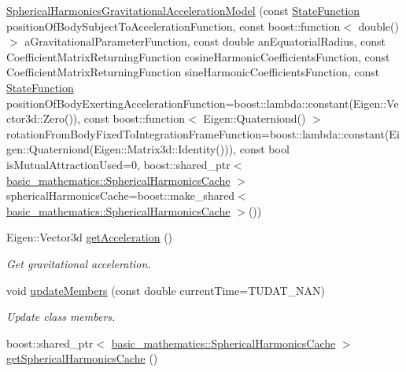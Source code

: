 \begin{DoxyCompactItemize}
\hyperlink{classtudat_1_1gravitation_1_1SphericalHarmonicsGravitationalAccelerationModel_ad222679658a992a85bf0c5dd7870b2a1}{Spherical\+Harmonics\+Gravitational\+Acceleration\+Model} (const \hyperlink{classtudat_1_1gravitation_1_1SphericalHarmonicsGravitationalAccelerationModelBase_a4ca706c4f941be481fc5f490e49390d8}{State\+Function} position\+Of\+Body\+Subject\+To\+Acceleration\+Function, const boost\+::function$<$ double() $>$ a\+Gravitational\+Parameter\+Function, const double an\+Equatorial\+Radius, const Coefficient\+Matrix\+Returning\+Function cosine\+Harmonic\+Coefficients\+Function, const Coefficient\+Matrix\+Returning\+Function sine\+Harmonic\+Coefficients\+Function, const \hyperlink{classtudat_1_1gravitation_1_1SphericalHarmonicsGravitationalAccelerationModelBase_a4ca706c4f941be481fc5f490e49390d8}{State\+Function} position\+Of\+Body\+Exerting\+Acceleration\+Function=boost\+::lambda\+::constant(Eigen\+::\+Vector3d\+::\+Zero()), const boost\+::function$<$ Eigen\+::\+Quaterniond() $>$ rotation\+From\+Body\+Fixed\+To\+Integration\+Frame\+Function=boost\+::lambda\+::constant(Eigen\+::\+Quaterniond(Eigen\+::\+Matrix3d\+::\+Identity())), const bool is\+Mutual\+Attraction\+Used=0, boost\+::shared\+\_\+ptr$<$ \hyperlink{classtudat_1_1basic__mathematics_1_1SphericalHarmonicsCache}{basic\+\_\+mathematics\+::\+Spherical\+Harmonics\+Cache} $>$ spherical\+Harmonics\+Cache=boost\+::make\+\_\+shared$<$ \hyperlink{classtudat_1_1basic__mathematics_1_1SphericalHarmonicsCache}{basic\+\_\+mathematics\+::\+Spherical\+Harmonics\+Cache} $>$())
\item 
Eigen\+::\+Vector3d \hyperlink{classtudat_1_1gravitation_1_1SphericalHarmonicsGravitationalAccelerationModel_aae27d6f97cdbee300e8c532b2dc604b3}{get\+Acceleration} ()
\begin{DoxyCompactList}\small\item\em Get gravitational acceleration. \end{DoxyCompactList}\item 
void \hyperlink{classtudat_1_1gravitation_1_1SphericalHarmonicsGravitationalAccelerationModel_a1da9ad8e2fd4daec7c60459175b264f6}{update\+Members} (const double current\+Time=T\+U\+D\+A\+T\+\_\+\+N\+AN)
\begin{DoxyCompactList}\small\item\em Update class members. \end{DoxyCompactList}\item 
boost\+::shared\+\_\+ptr$<$ \hyperlink{classtudat_1_1basic__mathematics_1_1SphericalHarmonicsCache}{basic\+\_\+mathematics\+::\+Spherical\+Harmonics\+Cache} $>$ \hyperlink{classtudat_1_1gravitation_1_1SphericalHarmonicsGravitationalAccelerationModel_af19b3b87fae113b8a77f1d061a092abb}{get\+Spherical\+Harmonics\+Cache} ()

\end{DoxyCompactItemize}
